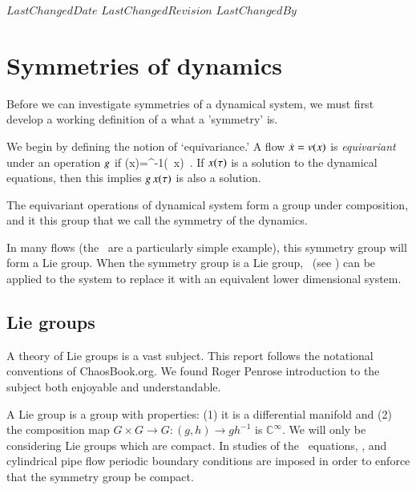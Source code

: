
{$LastChangedDate$}
{$LastChangedRevision$} {$LastChangedBy$}


\section{Symmetries of dynamics}
\label{sect:SymmDyn}

Before we can investigate symmetries of a dynamical system, we must first develop a working definition of a what a 'symmetry' is.

We begin by defining the notion of `equivariance.'
A flow $\dot{x}= v(x)$ is \emph{equivariant} under an operation $g$ if
\beq
\vel(x)=\LieEl^{-1}\vel(\LieEl \, x)
\,.
If $x(\tau)$ is a solution to the dynamical
equations, then this implies $g\,x(\tau)$ is also a solution.

The equivariant operations of dynamical system form a group under composition, and it this group that we call the symmetry of the dynamics.

In many flows (the \cLe\ are a particularly simple example), this symmetry group will form a Lie group. When the symmetry group is a Lie group, \mslices\ (see ) can be applied to the system to replace it with an equivalent lower dimensional system.


\subsection{Lie groups}

A theory of Lie groups is a vast subject. This report follows the notational conventions of ChaosBook.org. We found Roger Penrose introduction to the subject both enjoyable and understandable.
	\toCB

A Lie group is a group with properties: (1) it is a differential manifold and (2) the composition map $G \times G \rightarrow G : (g,h) \rightarrow g h^{-1}$ is $\mathbb{C}^\infty$. We will only be considering Lie groups which are compact.
In studies of the \KS\ equations, {\pCf}, and cylindrical pipe flow periodic boundary conditions are imposed in  order to enforce that the symmetry group be compact.

